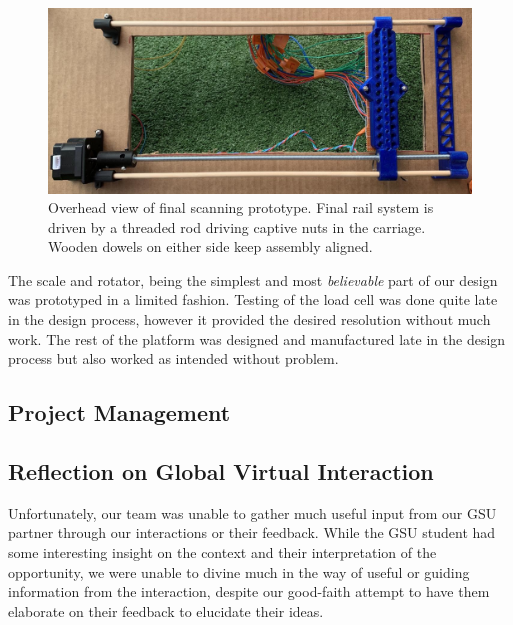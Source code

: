 \documentclass[12pt]{article}
\begin{document}
\begin{multicols*}{2}
            \begin{figure}[H]
                \centering\includegraphics[width=\linewidth]{CarriageV2.png}
                \captionsetup{width=\linewidth}
                \caption{Overhead view of final scanning prototype. Final rail system is driven by a threaded rod driving captive nuts in the carriage. Wooden dowels on either side keep assembly aligned.}
                \label{fig:OverheadV2}
            \end{figure}

            The scale and rotator, being the simplest and most \textit{believable} part of our design was prototyped in a limited fashion. Testing of the load cell was done quite late in the design process, however it provided the desired resolution without much work. The rest of the platform was designed and manufactured late in the design process but also worked as intended without problem.

        \subsection{Project Management}
            
        \subsection{Reflection on Global Virtual Interaction}
            Unfortunately, our team was unable to gather much useful input from our GSU partner through our interactions or their feedback. While the GSU student had some interesting insight on the context and their interpretation of the opportunity, we were unable to divine much in the way of useful or guiding information from the interaction, despite our good-faith attempt to have them elaborate on their feedback to elucidate their ideas. 


\end{multicols*}
\end{document}
